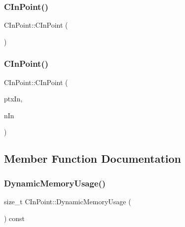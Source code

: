\subsubsection{\texorpdfstring{C\+In\+Point()}{CInPoint()}\hspace{0.1cm}{\footnotesize\ttfamily [1/2]}}
{\footnotesize\ttfamily C\+In\+Point\+::\+C\+In\+Point (\begin{DoxyParamCaption}{ }\end{DoxyParamCaption})\hspace{0.3cm}{\ttfamily [inline]}}

\mbox{\label{class_c_in_point_aa1aafd0f20137bcf79302bdb51ea2a0a}} 
\subsubsection{\texorpdfstring{C\+In\+Point()}{CInPoint()}\hspace{0.1cm}{\footnotesize\ttfamily [2/2]}}
{\footnotesize\ttfamily C\+In\+Point\+::\+C\+In\+Point (\begin{DoxyParamCaption}\item[{const C\+Transaction $\ast$}]{ptx\+In,  }\item[{uint32\+\_\+t}]{n\+In }\end{DoxyParamCaption})\hspace{0.3cm}{\ttfamily [inline]}}



\subsection{Member Function Documentation}
\mbox{\label{class_c_in_point_ab1c6e4bf3f021c4c8d0eca901dca732f}} 
\subsubsection{\texorpdfstring{Dynamic\+Memory\+Usage()}{DynamicMemoryUsage()}}
{\footnotesize\ttfamily size\+\_\+t C\+In\+Point\+::\+Dynamic\+Memory\+Usage (\begin{DoxyParamCaption}{ }\end{DoxyParamCaption}) const\hspace{0.3cm}{\ttfamily [inline]}}

